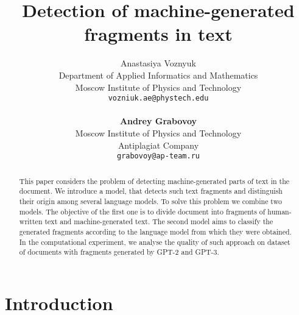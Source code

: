 \documentclass{article}
\title{Detection of machine-generated fragments in text}
\author{ Anastasiya Voznyuk \\
	Department of Applied Informatics and Mathematics\\
	Moscow Institute of Physics and Technology\\
	\texttt{vozniuk.ae@phystech.edu} \\
    \\
    \textbf{Andrey Grabovoy} \\
	Moscow Institute of Physics and Technology\\
    Antiplagiat Company \\
	\texttt{grabovoy@ap-team.ru}}
\date{}
\begin{document}
\maketitle

\begin{abstract}
	This paper considers the problem of detecting machine-generated parts of text in the document. We introduce a model, that detects such text fragments and distinguish their origin among several language models. To solve this problem we combine two models. The objective of the first one is to divide document into fragments of human-written text and machine-generated text. The second model aims to classify the generated fragments according to the language model from which they were obtained. In the computational experiment, we analyse the quality of such approach on dataset of documents with fragments generated by GPT-2 and GPT-3.
\end{abstract}



\section{Introduction}
\end{document}

